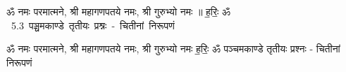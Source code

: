 \documentclass[17pt]{extarticle}
\begin{document}
\begin{titlepage}
    \begin{center}
 
\begin{sanskrit}
    { \Large
    ॐ नमः परमात्मने, श्री महागणपतये नमः, श्री गुरुभ्यो नमः ॥ ह॒रिः॒ ॐ 
    }
    \\
    \vspace{2.5cm}
    \mbox{ \Huge
    5.3      पञ्चमकाण्डे तृतीयः प्रश्नः - चितीनां निरूपणं   }
\end{sanskrit}
\end{center}

\end{titlepage}
\tableofcontents

ॐ नमः परमात्मने, श्री महागणपतये नमः, श्री गुरुभ्यो नमः
ह॒रिः॒ ॐ       पञ्चमकाण्डे तृतीयः प्रश्नः - चितीनां निरूपणं \newline

\end{document}
